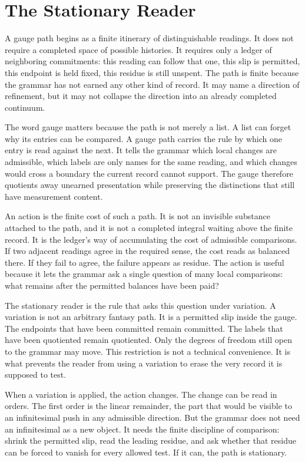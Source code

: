 \section{The Stationary Reader}

A gauge path begins as a finite itinerary of distinguishable readings. It
does not require a completed space of possible histories. It requires only a
ledger of neighboring commitments: this reading can follow that one, this
slip is permitted, this endpoint is held fixed, this residue is still
unspent. The path is finite because the grammar has not earned any other
kind of record. It may name a direction of refinement, but it may not
collapse the direction into an already completed continuum.

The word gauge matters because the path is not merely a list. A list can
forget why its entries can be compared. A gauge path carries the rule by
which one entry is read against the next. It tells the grammar which local
changes are admissible, which labels are only names for the same reading,
and which changes would cross a boundary the current record cannot support.
The gauge therefore quotients away unearned presentation while preserving
the distinctions that still have measurement content.

An action is the finite cost of such a path. It is not an invisible
substance attached to the path, and it is not a completed integral waiting
above the finite record. It is the ledger's way of accumulating the cost of
admissible comparisons. If two adjacent readings agree in the required
sense, the cost reads as balanced there. If they fail to agree, the failure
appears as residue. The action is useful because it lets the grammar ask a
single question of many local comparisons: what remains after the permitted
balances have been paid?

The stationary reader is the rule that asks this question under variation.
A variation is not an arbitrary fantasy path. It is a permitted slip inside
the gauge. The endpoints that have been committed remain committed. The
labels that have been quotiented remain quotiented. Only the degrees of
freedom still open to the grammar may move. This restriction is not a
technical convenience. It is what prevents the reader from using a
variation to erase the very record it is supposed to test.

When a variation is applied, the action changes. The change can be read in
orders. The first order is the linear remainder, the part that would be
visible to an infinitesimal push in any admissible direction. But the
grammar does not need an infinitesimal as a new object. It needs the finite
discipline of comparison: shrink the permitted slip, read the leading
residue, and ask whether that residue can be forced to vanish for every
allowed test. If it can, the path is stationary.

